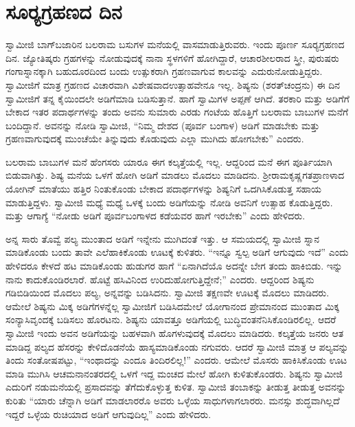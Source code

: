 
\chapter{ಸೂರ‍್ಯಗ್ರಹಣದ ದಿನ}

ಸ್ವಾಮೀಜಿ ಬಾಗ್‍ಬಜಾರಿನ ಬಲರಾಮ ಬಸುಗಳ ಮನೆಯಲ್ಲಿ ವಾಸಮಾಡುತ್ತಿರುವರು. ಇಂದು ಪೂರ್ಣ ಸೂರ‍್ಯಗ್ರಹಣದ ದಿನ. ಜ್ಯೋತಿಷ್ಕರು ಗ್ರಹಗಳನ್ನು ನೋಡುವುದಕ್ಕೆ ನಾನಾ ಸ್ಥಳಗಳಿಗೆ ಹೋಗಿದ್ದಾರೆ, ಆಚಾರಶೀಲರಾದ ಸ್ತ್ರೀ, ಪುರುಷರು ಗಂಗಾಸ್ನಾನಕ್ಕಾಗಿ ಬಹುದೂರದಿಂದ ಬಂದು ಉತ್ಸುಕರಾಗಿ ಗ್ರಹಣವಾಗುವ ಕಾಲವನ್ನು ಎದುರು\break ನೋಡುತ್ತಿದ್ದರು. ಸ್ವಾಮೀಜಿಗೆ ಮಾತ್ರ ಗ್ರಹಣದ ವಿಚಾರವಾಗಿ ವಿಶೇಷವಾದ\break ಉತ್ಸಾಹವೇನೂ ಇಲ್ಲ. ಶಿಷ್ಯನು (ಶರತ್‍ಚಂದ್ರನು) ಈ ದಿನ ಸ್ವಾಮೀಜಿಗೆ ತನ್ನ ಕೈಯಿಂದಲೇ ಅಡಿಗೆಮಾಡಿ ಬಡಿಸುತ್ತಾನೆ. ಹಾಗೆ ಸ್ವಾಮಿಗಳ ಅಪ್ಪಣೆ ಆಗಿದೆ. ತರಕಾರಿ ಮತ್ತು ಅಡಿಗೆಗೆ ಬೇಕಾದ ಇತರ ಪದಾರ್ಥಗಳನ್ನು ತಂದು ಅವನು ಸುಮಾರು ಎರಡು ಗಂಟೆಯ ಹೊತ್ತಿಗೆ ಬಲರಾಮ ಬಾಬುಗಳ ಮನೆಗೆ ಬಂದಿದ್ದಾನೆ. ಅವನನ್ನು ನೋಡಿ ಸ್ವಾಮೀಜಿ, “ನಿಮ್ಮ ದೇಶದ (ಪೂರ್ವ ಬಂಗಾಳ) ಅಡಿಗೆ ಮಾಡಬೇಕು ಮತ್ತು ಗ್ರಹಣವಾಗುವುದಕ್ಕೆ ಮುಂಚೆಯೇ ತಿನ್ನುವುದು ಕೊಡುವುದು ಎಲ್ಲಾ ಮುಗಿದು ಹೋಗಬೇಕು” ಎಂದರು. 

 ಬಲರಾಮ ಬಾಬುಗಳ ಮನೆ ಹೆಂಗಸರು ಯಾರೂ ಈಗ ಕಲ್ಕತ್ತೆಯಲ್ಲಿ ಇಲ್ಲ. ಆದ್ದರಿಂದ ಮನೆ ಈಗ ಪೂರ್ತಿಯಾಗಿ ಬಿಡುವಾಗಿತ್ತು. ಶಿಷ್ಯ ಮನೆಯ ಒಳಗೆ ಹೋಗಿ ಅಡಿಗೆ ಮಾಡಲು ಮೊದಲು ಮಾಡಿದನು. ಶ‍್ರೀರಾಮಕೃಷ್ಣಗತಪ್ರಾಣಳಾದ ಯೋಗಿನ್ ಮಾತೆಯು ಹತ್ತಿರ ನಿಂತುಕೊಂಡು ಬೇಕಾದ ಪದಾರ್ಥಗಳನ್ನು ಶಿಷ್ಯನಿಗೆ ಒದಗಿಸಿಕೊಡುತ್ತ ಸಹಾಯ ಮಾಡುತ್ತಿದ್ದಳು. ಸ್ವಾಮೀಜಿ ಮಧ್ಯೆ ಮಧ್ಯೆ ಒಳಕ್ಕೆ ಬಂದು ಅಡಿಗೆಯನ್ನು ನೋಡಿ ಅವನಿಗೆ ಉತ್ಸಾಹ ಕೊಡುತ್ತಿದ್ದರು. ಮತ್ತು ಆಗಾಗ್ಯೆ “ನೋಡು ಅಡಿಗೆ ಪೂರ್ವಬಂಗಾಳದ ಕಡೆಯವರ ಹಾಗೆ ಇರಬೇಕು” ಎಂದು ಹೇಳಿದರು. 

 ಅನ್ನ ಸಾರು ತೊವ್ವೆ ಪಲ್ಯ ಮುಂತಾದ ಅಡಿಗೆ ಇನ್ನೇನು ಮುಗಿದಂತೆ ಇತ್ತು. ಆ ಸಮಯದಲ್ಲಿ ಸ್ವಾಮೀಜಿ ಸ್ನಾನ ಮಾಡಿಕೊಂಡು ಬಂದು ತಾವೇ ಎಲೆಹಾಕಿಕೊಂಡು ಊಟಕ್ಕೆ ಕುಳಿತರು. “ಇನ್ನೂ ಸ್ವಲ್ಪ ಅಡಿಗೆ ಆಗುವುದು ಇದೆ” ಎಂದು ಹೇಳಿದರೂ ಕೇಳದೆ ಹಟ ಮಾಡಿಕೊಂಡು ಹುಡುಗರ ಹಾಗೆ “ಏನಾಗಿದೆಯೊ ಅದನ್ನೇ ಬೇಗ ತಂದು ಹಾಕಿಬಿಡು. ಇನ್ನು ನಾನು ಕಾದುಕೊಂಡಿರಲಾರೆ. ಹೊಟ್ಟೆ ಹಸಿವಿನಿಂದ ಉರಿದುಹೋಗುತ್ತಿದ್ದೇನೆ;” ಎಂದರು. ಆದ್ದರಿಂದ ಶಿಷ್ಯನು ಗಡಿಬಿಡಿಯಿಂದ ಮೊದಲು ಪಲ್ಯ, ಅನ್ನವನ್ನು ಬಡಿಸಿದನು. ಸ್ವಾಮೀಜಿ ತಕ್ಷಣವೇ ಊಟಕ್ಕೆ ಮೊದಲು ಮಾಡಿದರು. ಆಮೇಲೆ ಶಿಷ್ಯನು ಮಿಕ್ಕ ಅಡಿಗೆಗಳನ್ನೆಲ್ಲ ಸ್ವಾಮೀಜಿಗೆ ಬಡಿಸಿದಮೇಲೆ ಯೋಗಾನಂದ ಪ್ರೇಮಾನಂದ ಮುಂತಾದ ಮಿಕ್ಕ ಸಂನ್ಯಾಸಿವೃಂದಕ್ಕೆ ಬಡಿಸಲು ಹೊರಟನು. ಶಿಷ್ಯನು ಯಾವತ್ತೂ ಅಡಿಗೆಯಲ್ಲಿ ಬುದ್ಧಿವಂತನೆನಿಸಿಕೊಂಡಿರಲಿಲ್ಲ. ಆದರೆ ಸ್ವಾಮೀಜಿ ಇಂದು ಅವನ ಅಡಿಗೆಯನ್ನು ಬಹಳವಾಗಿ ಹೊಗಳುವುದಕ್ಕೆ ಮೊದಲು ಮಾಡಿದರು. ಕಲ್ಕತ್ತೆಯ ಜನರು ಆತ ಮಾಡಿದ್ದ ಪಲ್ಯದ ಹೆಸರನ್ನು ಕೇಳಿದೊಡನೆಯೆ ಹಾಸ್ಯಮಾಡಿಕೊಂಡು ನಗುವರು. ಆದರೆ ಸ್ವಾಮೀಜಿ ಮಾತ್ರ ಆ ಪಲ್ಯವನ್ನು ತಿಂದು ಸಂತೋಷಪಟ್ಟು, “ಇಂಥಾದನ್ನು ಎಂದೂ ತಿಂದಿರಲಿಲ್ಲ!” ಎಂದರು. ಆಮೇಲೆ ಮೊಸರು ಹಾಕಿಸಿಕೊಂಡು ಊಟ ಮಾಡಿ ಮುಗಿಸಿ ಆಚಮನಾನಂತರದಲ್ಲಿ ಒಳಗೆ ಇದ್ದ ಮಂಚದ ಮೇಲೆ ಹೋಗಿ ಕುಳಿತುಕೊಂಡರು. ಶಿಷ್ಯನು ಸ್ವಾಮೀಜಿ ಎದುರಿಗೆ ನಡುಮನೆಯಲ್ಲಿ ಪ್ರಸಾದವನ್ನು ತೆಗೆದುಕೊಳ್ಳುತ್ತ ಕುಳಿತ. ಸ್ವಾಮೀಜಿ ತಂಬಾಕನ್ನು ತೀಡುತ್ತ ತೀಡುತ್ತ ಅವನನ್ನು ಕುರಿತು “ಯಾರು ಚೆನ್ನಾಗಿ ಅಡಿಗೆ ಮಾಡಲಾರರೊ ಅವರು ಒಳ್ಳೆಯ ಸಾಧುಗಳಾಗಲಾರರು. ಮನಸ್ಸು ಶುದ್ಧವಾಗಿಲ್ಲದೆ ಇದ್ದರೆ ಒಳ್ಳೆಯ ರುಚಿಯಾದ ಅಡಿಗೆ ಆಗುವುದಿಲ್ಲ” ಎಂದು ಹೇಳಿದರು. 

